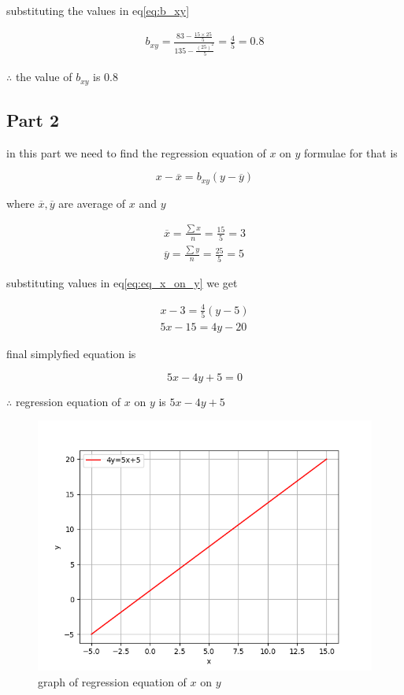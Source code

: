 \documentclass[journal,12pt,twocolumn]{IEEEtran}
\begin{document}
     substituting the values in eq\eqref{eq:b_xy} 
 
    \begin{align}
        b_{xy}=\frac{83-\frac{15\times25}{5}}{135-\frac{(25)^{2}}{5} } = \frac{4}{5} = 0.8
    \end{align}
     
$\therefore$ the value of $b_{xy}$ is 0.8
 
 
 
\subsection*{\textbf{Part 2}}
 in this part we need to find the regression equation of $x$ on $y$ formulae for that is 
 
    \begin{equation}
        \label{eq:eq_x_on_y}
        x-\overline{x} = b_{xy}(y-\overline{y})
    \end{equation}
       
  where $\overline{x},\overline{y}$ are average of $x$ and $y$
 
    \begin{align}
         \overline{x} = \frac{\sum x}{n} = \frac{15}{5} = 3 \\
         \overline{y} = \frac{\sum y}{n} = \frac{25}{5} = 5
    \end{align}
    
  substituting values in eq\eqref{eq:eq_x_on_y} we get 
 
    \begin{align}
         x-3 = \frac{4}{5}(y-5) \\
         5x - 15 = 4y - 20 
    \end{align}
    
   final simplyfied equation is 
   
    \begin{equation}
         \label{eq:3}
          5x - 4y + 5 = 0
    \end{equation}
    
$\therefore$ regression equation of $x$ on $y$ is $5x-4y+5$ 



    \begin{figure}[h!]
		\centering
     	\includegraphics[width=\columnwidth]{figures/Figure_1.png}
    	\caption{graph of regression equation of $x$ on $y$}
	    \label{Fig1}
    \end{figure}
\end{document}
